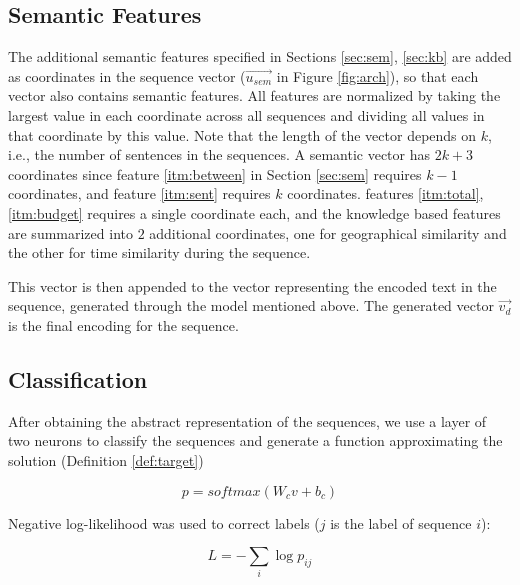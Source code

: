 \subsection{Semantic Features}
The additional semantic features specified 
in Sections \ref{sec:sem}, \ref{sec:kb} 
are added as coordinates in the sequence vector ($\vec{u_{sem}}$ in Figure \ref{fig:arch}), so that 
each vector also contains semantic features. 
All features are normalized by taking the largest 
value in each coordinate across all sequences and dividing 
all values in that coordinate by this value.  
Note that the length of the vector depends on $k$, 
i.e., the number of sentences in the sequences. 
A semantic vector has $2k+3$ coordinates since feature \ref{itm:between} in Section \ref{sec:sem} requires $k-1$ coordinates, and 
feature \ref{itm:sent} requires $k$ coordinates. 
features \ref{itm:total}, \ref{itm:budget} requires a single coordinate each, 
and the knowledge based features are summarized into $2$ additional coordinates, 
one for geographical similarity and the other for time similarity during the sequence. 

This vector is then appended to the vector representing the encoded text in the sequence, 
generated through the model mentioned above. 
The generated vector $\vec{v_d}$ is the final encoding for the sequence.


\subsection{Classification}
After obtaining the abstract representation of the sequences, 
we use a layer of two neurons to classify the sequences and 
generate a function approximating the solution (Definition \ref{def:target}) 

\begin{equation*}
	p = softmax(W_c v + b_c)
\end{equation*}

Negative log-likelihood was used to correct labels ($j$ is the label of sequence $i$): 

\begin{equation*}
	L = - \sum_{i} \log{p_{ij}}
\end{equation*}

